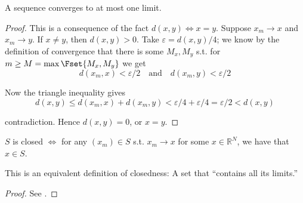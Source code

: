 \documentclass{article}
\begin{document}
\begin{claim}
  A sequence converges to at most one limit.
\end{claim}

\begin{proof}
  This is a consequence of the fact $d(x, y) \iff x = y$. Suppose $x_m \to x$ and $x_m \to y$. If $x \ne y$, then $d(x, y) > 0$. Take $\varepsilon = d(x, y) / 4$; we know by the definition of convergence that there is some $M_x, M_y$ s.t. for $m \ge M = \max\Fset{M_x, M_y}$ we get
  \[
    d(x_m, x) < \varepsilon / 2
    \quad
    \text{and}
    \quad
    d(x_m, y) < \varepsilon / 2
  \]

  Now the triangle inequality gives
  \[
    d(x, y)
    \le
    d(x_m, x) + d(x_m, y)
    <
    \varepsilon / 4
    +
    \varepsilon / 4
    =
    \varepsilon / 2
    <
    d(x, y)
  \]

  contradiction. Hence $d(x, y) = 0$, or $x = y$.
\end{proof}

\begin{theorem}\label{thm:lecture2_closed_sequential}
  $S$ is closed $\iff$ for any $(x_m) \in S$ s.t. $x_m \to x$ for some $x \in \mathbb{R}^N$, we have that $x \in S$.
\end{theorem}

This is an equivalent definition of closedness: A set that ``contains all its limits.''
\begin{proof}
  See .
\end{proof}
\end{document}
